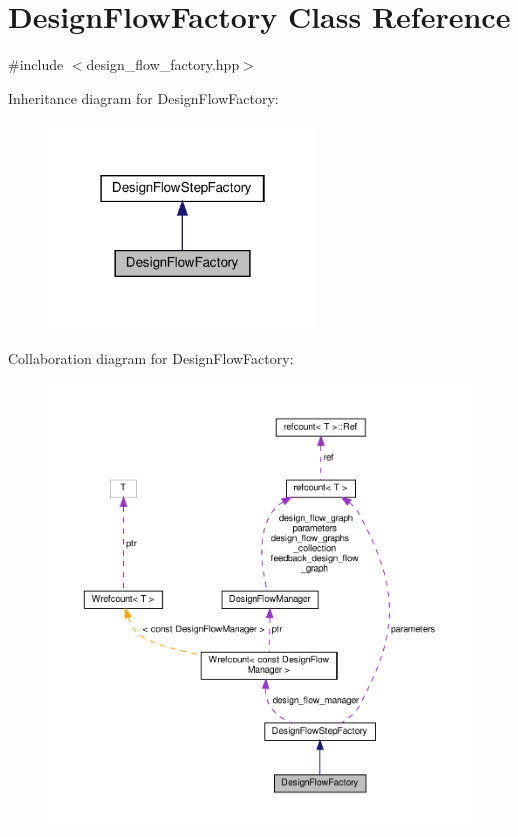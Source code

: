 \hypertarget{classDesignFlowFactory}{}\section{Design\+Flow\+Factory Class Reference}
\label{classDesignFlowFactory}


{\ttfamily \#include $<$design\+\_\+flow\+\_\+factory.\+hpp$>$}



Inheritance diagram for Design\+Flow\+Factory\+:
\nopagebreak
\begin{figure}[H]
\begin{center}
\leavevmode
\includegraphics[width=202pt]{d6/d29/classDesignFlowFactory__inherit__graph}
\end{center}
\end{figure}


Collaboration diagram for Design\+Flow\+Factory\+:
\nopagebreak
\begin{figure}[H]
\begin{center}
\leavevmode
\includegraphics[width=350pt]{dc/dc9/classDesignFlowFactory__coll__graph}
\end{center}
\end{figure}
